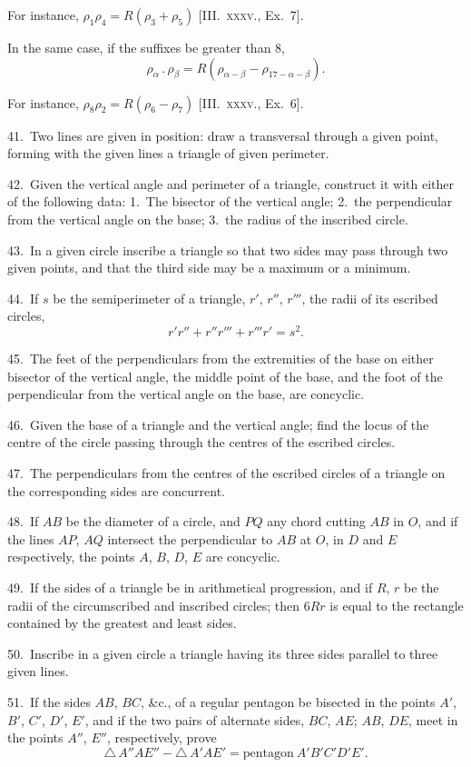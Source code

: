 \documentclass[oneside]{book}
\begin{document}
\begin{footnotesize}
For instance, \quad $\rho_1\rho_4 = R(\rho_3 + \rho_5)$ [\textsc{III\@.~xxxv.}, Ex.~7].

In the same case, if the suffixes be greater than 8,
\[
\rho_\alpha \,.\, \rho_\beta = R(\rho_{\alpha - \beta} - \rho_{17 - \alpha - \beta}).
\]

For instance, \quad $\rho_8 \rho_2 = R(\rho_6 - \rho_7)$ [\textsc{III\@.~xxxv.}, Ex.~6].

41.~Two lines are given in position: draw a transversal through
a given point, forming with the given lines a triangle of given
perimeter.

42.~Given the vertical angle and perimeter of a triangle, construct
it with either of the following data: 1.~The bisector of
the vertical angle; 2.~the perpendicular from the vertical angle
on the base; 3.~the radius of the inscribed circle.

43.~In a given circle inscribe a triangle so that two sides may
pass through two given points, and that the third side may be a
maximum or a minimum.

44.~If $s$ be the semiperimeter of a triangle, $r'$, $r''$, $r'''$, the
radii of its escribed circles,
\[
r'r'' + r''r''' + r'''r' = s^2.
\]

45.~The feet of the perpendiculars from the extremities of the
base on either bisector of the vertical angle, the middle point of
the base, and the foot of the perpendicular from the vertical
angle on the base, are concyclic.

46.~Given the base of a triangle and the vertical angle; find
the locus of the centre of the circle passing through the centres
of the escribed circles.

47.~The perpendiculars from the centres of the escribed circles
of a triangle on the corresponding sides are concurrent.

48.~If $AB$ be the diameter of a circle, and $PQ$ any chord cutting
$AB$ in $O$, and if the lines $AP$, $AQ$ intersect the perpendicular
to $AB$ at $O$, in $D$ and $E$ respectively, the points $A$, $B$, $D$, $E$ are
concyclic.

49.~If the sides of a triangle be in arithmetical progression,
and if $R$, $r$ be the radii of the circumscribed and inscribed circles;
then $6Rr$ is equal to the rectangle contained by the greatest and
least sides.

50.~Inscribe in a given circle a triangle having its three sides
parallel to three given lines.

51.~If the sides $AB$, $BC$, \&c., of a regular pentagon be bisected
in the points $A'$, $B'$, $C'$, $D'$, $E'$, and if the two pairs of alternate
sides, $BC$, $AE$; $AB$, $DE$, meet in the points $A''$, $E''$, respectively,
prove
\[
\triangle\, A''AE'' - \triangle\, A'AE' = \text{pentagon}\ A'B'C'D'E'.
\]


\end{footnotesize}
\end{document}
